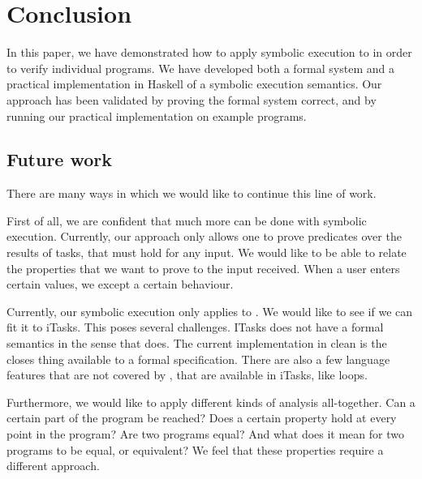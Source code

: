 
\section{Conclusion}

\label{sec:conclusion}

In this paper, we have demonstrated how to apply symbolic execution to \TOPHAT in order to verify individual programs.
We have developed both a formal system and a practical implementation in Haskell of a symbolic execution semantics.
Our approach has been validated by proving the formal system correct, and by running our practical implementation on example programs.

\subsection{Future work}

There are many ways in which we would like to continue this line of work.

First of all, we are confident that much more can be done with symbolic execution.
Currently, our approach only allows one to prove predicates over the results of tasks, that must hold for any input.
We would like to be able to relate the properties that we want to prove to the input received.
When a user enters certain values, we except a certain behaviour.

Currently, our symbolic execution only applies to \TOPHAT.
We would like to see if we can fit it to iTasks.
This poses several challenges.
ITasks does not have a formal semantics in the sense that \TOPHAT does.
The current implementation in clean is the closes thing available to a formal specification.
There are also a few language features that are not covered by \TOPHAT, that are available in iTasks, like loops.


Furthermore, we would like to apply different kinds of analysis all-together.
Can a certain part of the program be reached?
Does a certain property hold at every point in the program?
Are two programs equal? And what does it mean for two programs to be equal, or equivalent?
We feel that these properties require a different  approach.
